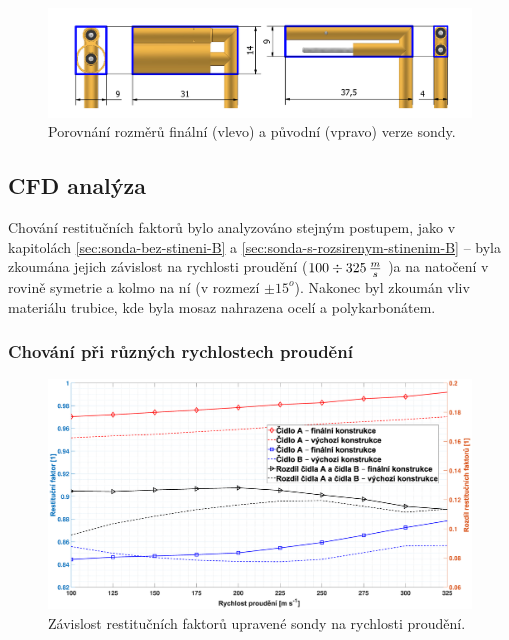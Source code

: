         

        \begin{figure}[ht!]
            \centering
            \includegraphics[width=\textwidth]{500_FINAL/porovnani_v01_final.png}
            \caption{Porovnání rozměrů finální (vlevo) a původní (vpravo) verze sondy.}
            \label{fig:sonda-final-porovnani}
        \end{figure}
        
    \subsection{CFD analýza}
        Chování restitučních faktorů bylo analyzováno stejným postupem, jako v kapitolách \ref{sec:sonda-bez-stineni-B} a \ref{sec:sonda-s-rozsirenym-stinenim-B} – byla zkoumána jejich závislost na rychlosti proudění ($100 \div 325 \, \frac{m}{s}$ )a na natočení v rovině symetrie a kolmo na ní (v rozmezí $\pm 15^o$). Nakonec byl zkoumán vliv materiálu trubice, kde byla mosaz nahrazena ocelí a polykarbonátem.
        \subsubsection{Chování při různých rychlostech proudění}
            \begin{figure}[ht!]
                \centering
                \includegraphics*[width=\textwidth, trim={5.9cm 1.0cm 2.7cm 2.0cm}]{500_FINAL/final_rychlosti.eps}
                \caption{Závislost restitučních faktorů upravené sondy na rychlosti proudění.}
                \label{fig:sonda-final-rychlosti}
            \end{figure}


